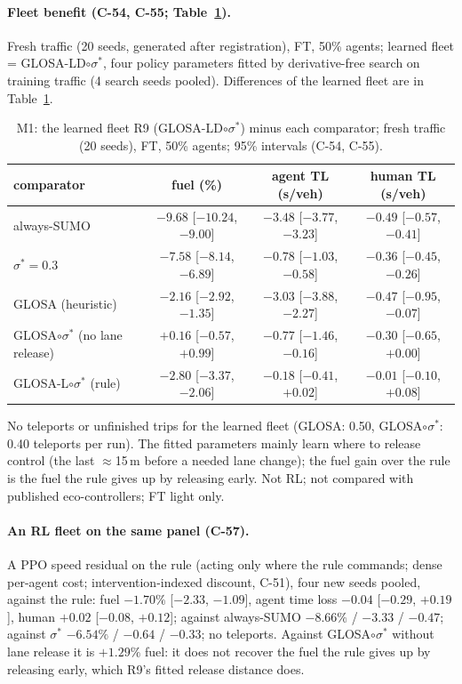 \documentclass[11pt]{article}
\begin{document}
\paragraph{Fleet benefit (C-54, C-55; Table~\ref{tab:m1}).} Fresh traffic (20 seeds, generated after registration), FT, 50\% agents; learned
fleet = GLOSA-LD$\circ\sigma^*$, four policy parameters fitted by derivative-free search on training traffic (4 search seeds pooled).
Differences of the learned fleet are in Table~\ref{tab:m1}.
\begin{table}[t]\centering\small
\caption{M1: the learned fleet R9 (GLOSA-LD$\circ\sigma^*$) minus each comparator; fresh traffic (20 seeds), FT, 50\% agents; 95\%
intervals (C-54, C-55).}\label{tab:m1}
\begin{tabular}{lccc}\toprule
comparator & fuel (\%) & agent TL (s/veh) & human TL (s/veh)\\\midrule
always-SUMO & $-9.68$ [$-10.24$, $-9.00$] & $-3.48$ [$-3.77$, $-3.23$] & $-0.49$ [$-0.57$, $-0.41$]\\
$\sigma^*=0.3$ & $-7.58$ [$-8.14$, $-6.89$] & $-0.78$ [$-1.03$, $-0.58$] & $-0.36$ [$-0.45$, $-0.26$]\\
GLOSA (heuristic) & $-2.16$ [$-2.92$, $-1.35$] & $-3.03$ [$-3.88$, $-2.27$] & $-0.47$ [$-0.95$, $-0.07$]\\
GLOSA$\circ\sigma^*$ (no lane release) & $+0.16$ [$-0.57$, $+0.99$] & $-0.77$ [$-1.46$, $-0.16$] & $-0.30$ [$-0.65$, $+0.00$]\\
GLOSA-L$\circ\sigma^*$ (rule) & $-2.80$ [$-3.37$, $-2.06$] & $-0.18$ [$-0.41$, $+0.02$] & $-0.01$ [$-0.10$, $+0.08$]\\\bottomrule
\end{tabular}\end{table}
No teleports or unfinished trips for the learned fleet (GLOSA: 0.50, GLOSA$\circ\sigma^*$: 0.40 teleports per run). The fitted
parameters mainly learn where to release control (the last $\approx$15\,m before a needed lane change); the fuel gain over the rule is the
fuel the rule gives up by releasing early. Not RL; not compared with published eco-controllers; FT light only.
\paragraph{An RL fleet on the same panel (C-57).} A PPO speed residual on the rule (acting only where the rule commands; dense per-agent
cost; intervention-indexed discount, C-51), four new seeds pooled, against the rule: fuel $-1.70\%$ [$-2.33$, $-1.09$], agent time loss
$-0.04$ [$-0.29$, $+0.19$], human $+0.02$ [$-0.08$, $+0.12$]; against always-SUMO $-8.66\%$ / $-3.33$ / $-0.47$; against $\sigma^*$
$-6.54\%$ / $-0.64$ / $-0.33$; no teleports. Against GLOSA$\circ\sigma^*$ without lane release it is $+1.29\%$ fuel: it does not recover the fuel the
rule gives up by releasing early, which R9's fitted release distance does.
\end{document}
